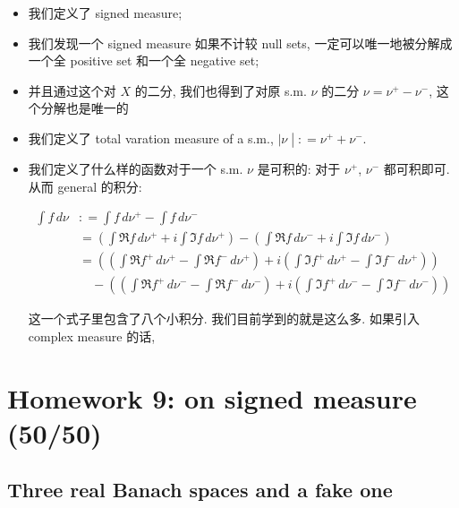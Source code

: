 \documentclass{qlnotes-export}
\begin{document}
\begin{itemize}
\item
  我们定义了 signed measure;
\item
  我们发现一个 signed measure 如果不计较 null sets, 一定可以唯一地被分解成一个全 positive set 和一个全 negative set;
\item
  并且通过这个对 \(X\) 的二分, 我们也得到了对原 s.m. \(\nu\) 的二分 \(\nu = \nu^{+} - \nu^{-}\), 这个分解也是唯一的
\item
  我们定义了 total varation measure of a s.m., \(\left. |\nu \middle| : = \nu^{+} + \nu^{-} \right.\).
\item
  我们定义了什么样的函数对于一个 s.m. \(\nu\) 是可积的: 对于 \(\nu^{+}\), \(\nu^{-}\) 都可积即可. 从而 general 的积分:

  \[\begin{matrix}
  {\int f\, d\nu} & {: = \int f\, d\nu^{+} - \int f\, d\nu^{-}} \\
   & {= (\int\Re f\, d\nu^{+} + i\int\Im f\, d\nu^{+}) - (\int\Re f\, d\nu^{-} + i\int\Im f\, d\nu^{-})} \\
   & {= ((\int\Re f^{+}\, d\nu^{+} - \int\Re f^{-}\, d\nu^{+}) + i(\int\Im f^{+}\, d\nu^{+} - \int\Im f^{-}\, d\nu^{+}))} \\
   & {\quad - ((\int\Re f^{+}\, d\nu^{-} - \int\Re f^{-}\, d\nu^{-}) + i(\int\Im f^{+}\, d\nu^{-} - \int\Im f^{-}\, d\nu^{-}))}
  \end{matrix}\]

  这一个式子里包含了八个小积分. 我们目前学到的就是这么多. 如果引入 complex measure 的话,
\end{itemize}

\chapter{Homework 9: on signed measure (50/50)}\label{homework-9-on-signed-measure-5050}

\section{Three real Banach spaces and a fake one}\label{three-real-banach-spaces-and-a-fake-one}
\end{document}
